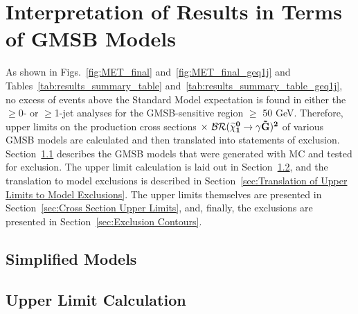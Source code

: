 \documentclass[dissertation.tex]{subfiles}
\begin{document}
\chapter{Interpretation of Results in Terms of GMSB Models}
\label{chap:Interpretation of Results in Terms of GMSB Models}

As shown in Figs.~\ref{fig:MET_final} and~\ref{fig:MET_final_geq1j} and Tables~\ref{tab:results_summary_table} and~\ref{tab:results_summary_table_geq1j}, no excess of events above the Standard Model expectation is found in either the $\geq$0- or $\geq$1-jet analyses for the GMSB-sensitive region \MET $\geq$ 50 GeV.  Therefore, upper limits on the production cross sections \textcolor{red}{\textbf{$\mathbf{\times\mbox{ }\mathcal{BR}(\widetilde{\chi}_{1}^{0}\rightarrow\gamma\tilde{G})^{2}}$}} of various GMSB models are calculated and then translated into statements of exclusion.  Section~\ref{sec:Simplified Models} describes the GMSB models that were generated with MC and tested for exclusion.  The upper limit calculation is laid out in Section~\ref{sec:Upper Limit Calculation}, and the translation to model exclusions is described in Section~\ref{sec:Translation of Upper Limits to Model Exclusions}.  The upper limits themselves are presented in Section~\ref{sec:Cross Section Upper Limits}, and, finally, the exclusions are presented in Section~\ref{sec:Exclusion Contours}.

\section{Simplified Models}
\label{sec:Simplified Models}

\section{Upper Limit Calculation}
\label{sec:Upper Limit Calculation}
\end{document}
